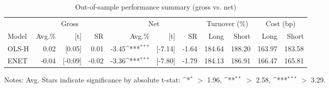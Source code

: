 \begin{table}[!ht]
\centering
\caption{Out-of-sample performance summary (gross vs. net)}
\label{tab:summary_performance}
\begingroup
\def\sym#1{\ifmmode^{#1}\else\(^{#1}\)\fi}
\setlength{\tabcolsep}{6pt}
\renewcommand{\arraystretch}{1.2}
\begin{tabular}{lrrrrrrrrrr}
\toprule
& \multicolumn{3}{c}{Gross} & \multicolumn{3}{c}{Net} & \multicolumn{2}{c}{Turnover (\%)} & \multicolumn{2}{c}{Cost (bp)}\\
\cmidrule(lr){2-4}\cmidrule(lr){5-7}\cmidrule(lr){8-9}\cmidrule(lr){10-11}
Model & Avg.\% & {[t]} & SR & Avg.\% & {[t]} & SR & Long & Short & Long & Short\\
\midrule
OLS-H & 0.02 & [0.05] & 0.01 & -3.45\sym{***} & [-7.14] & -1.64 & 184.64 & 188.20 & 163.97 & 183.58 \\
ENET & -0.04 & [-0.09] & -0.02 & -3.36\sym{***} & [-7.80] & -1.79 & 184.13 & 186.91 & 166.47 & 165.81 \\
\bottomrule
\end{tabular}
\par\smallskip \footnotesize Notes: Avg.%
Stars indicate significance by absolute t-stat: \sym{*} $>$ 1.96, \sym{**} $>$ 2.58, \sym{***} $>$ 3.29.
\endgroup
\end{table}